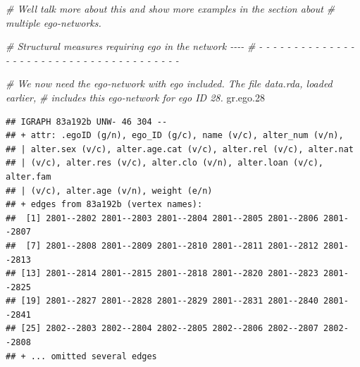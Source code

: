 \documentclass[
]{book}
\newenvironment{Shaded}{\begin{snugshade}}{\end{snugshade}}
\newcommand{\AttributeTok}[1]{\textcolor[rgb]{0.13,0.29,0.53}{#1}}
\newcommand{\CommentTok}[1]{\textcolor[rgb]{0.56,0.35,0.01}{\textit{#1}}}
\newcommand{\ConstantTok}[1]{\textcolor[rgb]{0.56,0.35,0.01}{#1}}
\newcommand{\FloatTok}[1]{\textcolor[rgb]{0.00,0.00,0.81}{#1}}
\newcommand{\FunctionTok}[1]{\textcolor[rgb]{0.13,0.29,0.53}{\textbf{#1}}}
\newcommand{\NormalTok}[1]{#1}
\newcommand{\OtherTok}[1]{\textcolor[rgb]{0.56,0.35,0.01}{#1}}
\newcommand{\StringTok}[1]{\textcolor[rgb]{0.31,0.60,0.02}{#1}}
\begin{document}
\begin{Shaded}
\begin{Highlighting}[]
\CommentTok{\# We\textquotesingle{}ll talk more about this and show more examples in the section about }
\CommentTok{\# multiple ego{-}networks.}

\CommentTok{\# Structural measures requiring ego in the network                          {-}{-}{-}{-}}
\CommentTok{\# {-} {-} {-} {-} {-} {-} {-} {-} {-} {-} {-} {-} {-} {-} {-} {-} {-} {-} {-} {-} {-} {-} {-} {-} {-} {-} {-} {-} {-} {-} {-} {-} {-} {-} {-} {-} {-} {-} {-} }

\CommentTok{\# We now need the ego{-}network with ego included. The file data.rda, loaded earlier,}
\CommentTok{\# includes this ego{-}network for ego ID 28. }
\NormalTok{gr.ego}\FloatTok{.28}
\end{Highlighting}
\end{Shaded}

\begin{verbatim}
## IGRAPH 83a192b UNW- 46 304 -- 
## + attr: .egoID (g/n), ego_ID (g/c), name (v/c), alter_num (v/n),
## | alter.sex (v/c), alter.age.cat (v/c), alter.rel (v/c), alter.nat
## | (v/c), alter.res (v/c), alter.clo (v/n), alter.loan (v/c), alter.fam
## | (v/c), alter.age (v/n), weight (e/n)
## + edges from 83a192b (vertex names):
##  [1] 2801--2802 2801--2803 2801--2804 2801--2805 2801--2806 2801--2807
##  [7] 2801--2808 2801--2809 2801--2810 2801--2811 2801--2812 2801--2813
## [13] 2801--2814 2801--2815 2801--2818 2801--2820 2801--2823 2801--2825
## [19] 2801--2827 2801--2828 2801--2829 2801--2831 2801--2840 2801--2841
## [25] 2802--2803 2802--2804 2802--2805 2802--2806 2802--2807 2802--2808
## + ... omitted several edges
\end{verbatim}

\begin{Shaded}
\end{Shaded}
\end{document}
